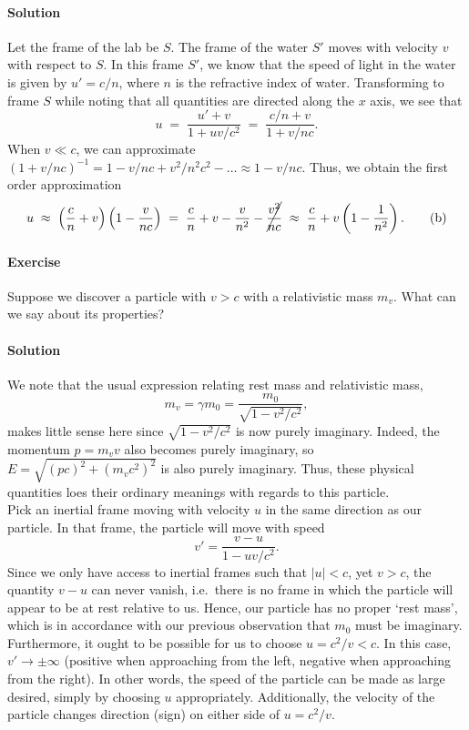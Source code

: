 \documentclass[10pt]{article}
\newcounter{prob}
\def\problem{\stepcounter{prob}\paragraph{Exercise \arabic{prob}}}
\def\solution{\paragraph{Solution}}
\begin{document}
        \solution Let the frame of the lab be $S$. The frame of the water $S'$ moves with velocity $v$ with respect to $S$.
        In this frame $S'$, we know that the speed of light in the water is given by $u' = c / n$, where $n$ is the refractive index of water.
        Transforming to frame $S$ while noting that all quantities are directed along the $x$ axis, we see that
        \[
                u \;=\; \frac{u' + v}{1 + uv/c^2} \;=\; \frac{c/n + v}{1 + v/nc}. \tag{a}
        \]
        When $v \ll c$, we can approximate $(1 + v/nc)^{-1} = 1 - v/nc + v^2 /n^2c^2 - \dots \approx 1 - v/nc$.
        Thus, we obtain the first order approximation
        \[
                u \;\approx\; \left(\frac{c}{n} + v\right)\left(1 - \frac{v}{nc}\right) \;=\; \frac{c}{n} + v - \frac{v}{n^2} - \cancel{\frac{v^2}{nc}}
                        \;\approx\; \frac{c}{n} + v\left(1 - \frac{1}{n^2}\right). \tag{b}
        \]

        \problem Suppose we discover a particle with $v > c$ with a relativistic mass $m_v$. What can we say about its properties?

        \solution We note that the usual expression relating rest mass and relativistic mass,
        \[
                m_v = \gamma m_0 = \frac{m_0}{\sqrt{1 - v^2 /c^2}},
        \]
        makes little sense here since $\sqrt{1 - v^2 /c^2}$ is now purely imaginary.
        Indeed, the momentum $p = m_v v$ also becomes purely imaginary, so $E = \sqrt{(pc)^2 + (m_v c^2)^2}$ is also purely imaginary.
        Thus, these physical quantities loes their ordinary meanings with regards to this particle. \\

        Pick an inertial frame moving with velocity $u$ in the same direction as our particle. In that frame, the particle will move with speed
        \[
                v' = \frac{v - u}{1 - uv/c^2}.
        \]
        Since we only have access to inertial frames such that $|u| < c$, yet $v > c$, the quantity $v - u$ can never vanish, i.e.\ 
        there is no frame in which the particle will appear to be at rest relative to us.
        Hence, our particle has no proper `rest mass', which is in accordance with our previous observation that $m_0$ must be imaginary.
        Furthermore, it ought to be possible for us to choose $u = c^2 / v < c$. In this case, $v' \to \pm\infty$ (positive when approaching 
        from the left, negative when approaching from the right). In other words, the speed of the particle can be made as large
        desired, simply by choosing $u$ appropriately. Additionally, the velocity of the particle changes direction (sign) on either
        side of $u = c^2 /v$.
\end{document}
